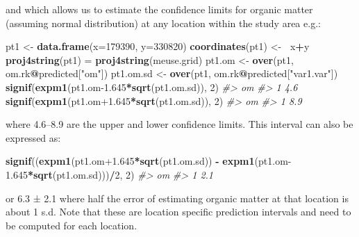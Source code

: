 \documentclass[11pt]{krantz}
\newenvironment{Shaded}{\begin{snugshade}}{\end{snugshade}}
\newcommand{\CommentTok}[1]{\textcolor[rgb]{0.37,0.37,0.37}{\textit{#1}}}
\newcommand{\DataTypeTok}[1]{\textcolor[rgb]{0.27,0.27,0.27}{#1}}
\newcommand{\DecValTok}[1]{\textcolor[rgb]{0.06,0.06,0.06}{#1}}
\newcommand{\ErrorTok}[1]{\textcolor[rgb]{0.14,0.14,0.14}{\textbf{#1}}}
\newcommand{\FloatTok}[1]{\textcolor[rgb]{0.06,0.06,0.06}{#1}}
\newcommand{\KeywordTok}[1]{\textcolor[rgb]{0.27,0.27,0.27}{\textbf{#1}}}
\newcommand{\NormalTok}[1]{#1}
\newcommand{\OperatorTok}[1]{\textcolor[rgb]{0.43,0.43,0.43}{\textbf{#1}}}
\newcommand{\StringTok}[1]{\textcolor[rgb]{0.5,0.5,0.5}{#1}}
\theoremstyle{definition}
\theoremstyle{definition}
\theoremstyle{definition}
\theoremstyle{remark}
\begin{document}
and which allows us to estimate the confidence limits for organic matter
(assuming normal distribution) at any location within the study area
e.g.:

\begin{Shaded}
\begin{Highlighting}[]
\NormalTok{pt1 <-}\StringTok{ }\KeywordTok{data.frame}\NormalTok{(}\DataTypeTok{x=}\DecValTok{179390}\NormalTok{, }\DataTypeTok{y=}\DecValTok{330820}\NormalTok{)}
\KeywordTok{coordinates}\NormalTok{(pt1) <-}\StringTok{ }\ErrorTok{~}\NormalTok{x}\OperatorTok{+}\NormalTok{y}
\KeywordTok{proj4string}\NormalTok{(pt1) =}\StringTok{ }\KeywordTok{proj4string}\NormalTok{(meuse.grid)}
\NormalTok{pt1.om <-}\StringTok{ }\KeywordTok{over}\NormalTok{(pt1, om.rk}\OperatorTok{@}\NormalTok{predicted[}\StringTok{"om"}\NormalTok{])}
\NormalTok{pt1.om.sd <-}\StringTok{ }\KeywordTok{over}\NormalTok{(pt1, om.rk}\OperatorTok{@}\NormalTok{predicted[}\StringTok{"var1.var"}\NormalTok{])}
\KeywordTok{signif}\NormalTok{(}\KeywordTok{expm1}\NormalTok{(pt1.om}\FloatTok{-1.645}\OperatorTok{*}\KeywordTok{sqrt}\NormalTok{(pt1.om.sd)), }\DecValTok{2}\NormalTok{)}
\CommentTok{#>    om}
\CommentTok{#> 1 4.6}
\KeywordTok{signif}\NormalTok{(}\KeywordTok{expm1}\NormalTok{(pt1.om}\FloatTok{+1.645}\OperatorTok{*}\KeywordTok{sqrt}\NormalTok{(pt1.om.sd)), }\DecValTok{2}\NormalTok{)}
\CommentTok{#>    om}
\CommentTok{#> 1 8.9}
\end{Highlighting}
\end{Shaded}

where 4.6--8.9 are the upper and lower confidence limits. This interval
can also be expressed as:

\begin{Shaded}
\begin{Highlighting}[]
\KeywordTok{signif}\NormalTok{((}\KeywordTok{expm1}\NormalTok{(pt1.om}\FloatTok{+1.645}\OperatorTok{*}\KeywordTok{sqrt}\NormalTok{(pt1.om.sd)) }\OperatorTok{-}
\StringTok{       }\KeywordTok{expm1}\NormalTok{(pt1.om}\FloatTok{-1.645}\OperatorTok{*}\KeywordTok{sqrt}\NormalTok{(pt1.om.sd)))}\OperatorTok{/}\DecValTok{2}\NormalTok{, }\DecValTok{2}\NormalTok{)}
\CommentTok{#>    om}
\CommentTok{#> 1 2.1}
\end{Highlighting}
\end{Shaded}

or 6.3 ± 2.1 where half the error of estimating organic matter at that
location is about 1 s.d. Note that these are location specific
prediction intervals and need to be computed for each location.
\end{document}
